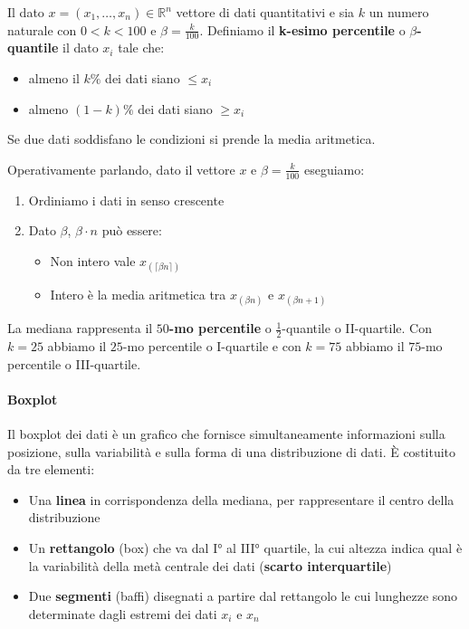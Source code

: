\newpage
\begin{definition}
	Il dato $x=(x_1, \ldots, x_n) \in \mathbb{R}^n$ vettore di dati quantitativi e sia $k$ un numero naturale con $0 < k < 100$ e $\beta = \frac{k}{100}$. Definiamo il \textbf{k-esimo percentile} o \textbf{$\beta$-quantile} il dato $x_i$ tale che:
	\begin{itemize}
		\item almeno il $k\%$ dei dati siano $\leq x_i$
		\item almeno $(1- k)\%$ dei dati siano $\geq x_i$
	\end{itemize}
	Se due dati soddisfano le condizioni si prende la media aritmetica.\\
\end{definition}

\noindent Operativamente parlando, dato il vettore $x$ e $\beta=\frac{k}{100}$ eseguiamo:
\begin{enumerate}
	\item Ordiniamo i dati in senso crescente
	\item Dato $\beta$, $\beta \cdot n$ può essere:
	\begin{itemize}
		\item Non intero vale $x_{(\lceil\beta n \rceil)}$
		\item Intero è la media aritmetica tra $x_{(\beta n)}$ e $x_{(\beta n +1)}$
	\end{itemize}
\end{enumerate}

\begin{observation}
	La mediana rappresenta il $50$\textbf{-mo percentile} o $\frac{1}{2}$-quantile o II-quartile. Con $k=25$ abbiamo il $25$-mo percentile o I-quartile e con $k=75$ abbiamo il $75$-mo percentile o III-quartile.
\end{observation}

\paragraph{Boxplot} Il boxplot dei dati è un grafico che fornisce simultaneamente informazioni sulla posizione, sulla variabilità e sulla forma di una distribuzione di dati. È costituito da tre elementi:
\begin{itemize}
	\item Una \textbf{linea} in corrispondenza della mediana, per rappresentare il centro della distribuzione
	\item Un \textbf{rettangolo} (box) che va dal I° al III° quartile, la cui altezza indica qual è la variabilità della metà centrale dei dati (\textbf{scarto interquartile})
	\item Due \textbf{segmenti} (baffi) disegnati a partire dal rettangolo le cui lunghezze sono determinate dagli estremi dei dati $x_i$ e $x_n$
\end{itemize}

